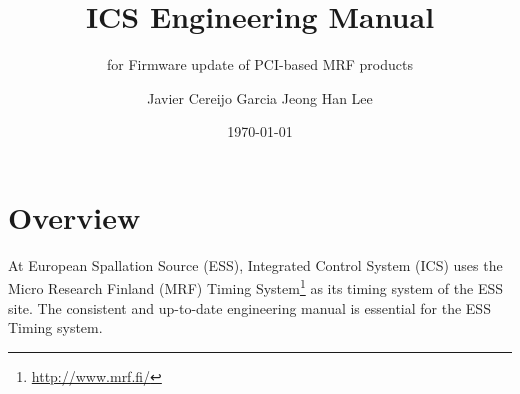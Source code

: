 \documentclass[11pt
  , a4paper
  , article
  , oneside
  , showtrims
]{memoir}
\begin{document}


\date{\today}




\title{ICS Engineering Manual}
\subtitle{for Firmware update of PCI-based MRF products}
\author{Javier Cereijo Garcia \newline Jeong Han Lee }



\showtrimson

\esstitle
\newpage
\tableofcontents
\newpage



\chapter{Overview}
At European Spallation Source (ESS), Integrated Control System (ICS) uses the Micro Research Finland (MRF) Timing System{\footnote{\url{http://www.mrf.fi/}}} as its timing system of the ESS site. The consistent and up-to-date engineering manual is essential for the ESS Timing system.
\end{document}
